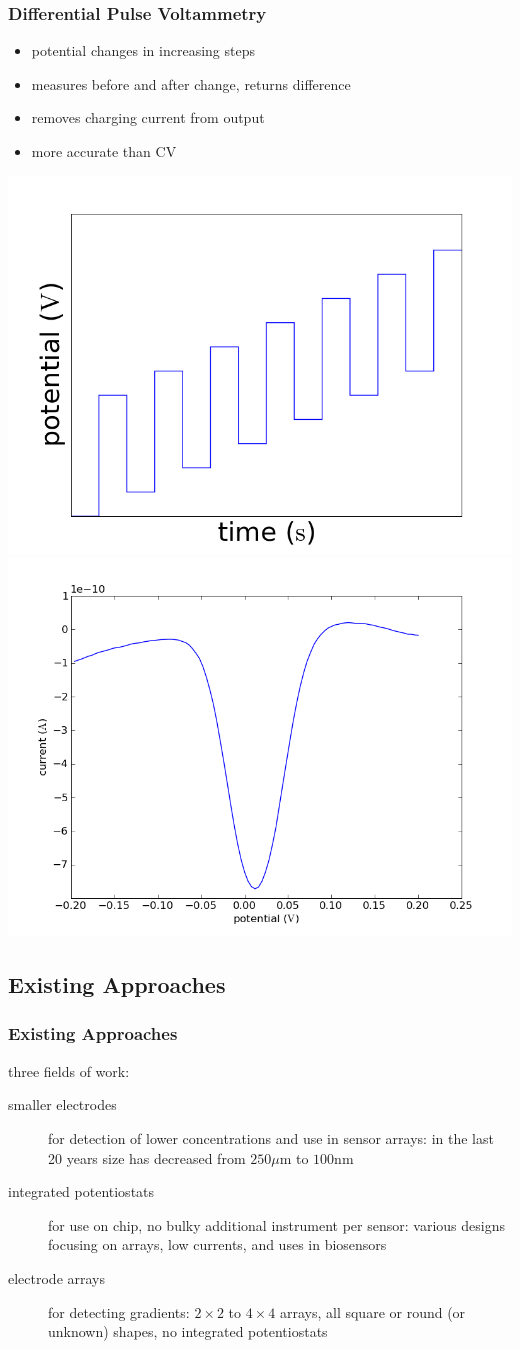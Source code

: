 \documentclass[10pt]{beamer}
\begin{document}
\begin{frame}
	\frametitle{Differential Pulse Voltammetry}
	\begin{itemize}
		\item potential changes in increasing steps
		\item measures before and after change, returns difference
		\item removes charging current from output
		\item more accurate than CV
	\end{itemize}
	\includegraphics[width=0.5\linewidth]{figures/dpv.png}
	\includegraphics[width=0.5\linewidth]{figures/256.png}
\end{frame}

\subsection{Existing Approaches}
\begin{frame}
	\frametitle{Existing Approaches}
	three fields of work:
	\begin{description}
		\item[smaller electrodes] for detection of lower concentrations and use in sensor arrays: in the last 20 years size has decreased from $250 \mu \mathrm{m}$ to $100 \mathrm{nm}$
		\item[integrated potentiostats] for use on chip, no bulky additional instrument per sensor: various designs focusing on arrays, low currents, and uses in biosensors
		\item[electrode arrays] for detecting gradients: $2 \times 2$ to $4 \times 4$ arrays, all square or round (or unknown) shapes, no integrated potentiostats
	\end{description}
\end{frame}
\end{document}
